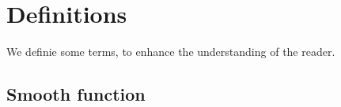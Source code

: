 \chapter{Definitions}\label{app:definitions} We definie some terms, to enhance the understanding of the reader.

\section{Smooth function}\label{f:smooth}
